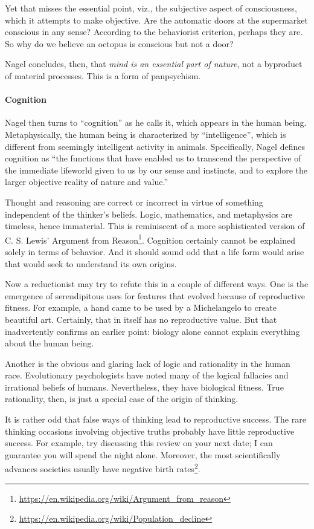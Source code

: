 Yet that misses the essential point, viz., the subjective aspect of consciousness, which it attempts to make objective.
Are the automatic doors at the supermarket conscious in any sense? According to the behaviorist criterion, perhaps they
are. So why do we believe an octopus is conscious but not a door?

Nagel concludes, then, that \emph{mind is an essential part of nature}, not a byproduct of material processes. This is a
form of panpsychism.

\paragraph{Cognition}
Nagel then turns to “cognition” as he calls it, which appears in the human being. Metaphysically, the human being is
characterized by “intelligence”, which is different from seemingly intelligent activity in animals. Specifically, Nagel
defines cognition as “the functions that have enabled us to transcend the perspective of the immediate lifeworld given
to us by our sense and instincts, and to explore the larger objective reality of nature and value.”

Thought and reasoning are correct or incorrect in virtue of something independent of the thinker's beliefs.
Logic, mathematics, and metaphysics are timeless, hence immaterial. This is reminiscent of a more sophisticated version
of C. S. Lewis' Argument from Reason\footnote{\url{https://en.wikipedia.org/wiki/Argument_from_reason}}. Cognition certainly cannot be explained solely in terms of behavior.
And it should sound odd that a life form would arise that would seek to understand its own origins.

Now a reductionist may try to refute this in a couple of different ways. One is the emergence of serendipitous uses for
features that evolved because of reproductive fitness. For example, a hand came to be used by a Michelangelo to create
beautiful art. Certainly, that in itself has no reproductive value. But that inadvertently confirms an earlier point:
biology alone cannot explain everything about the human being.

Another is the obvious and glaring lack of logic and rationality in the human race. Evolutionary psychologists have
noted many of the logical fallacies and irrational beliefs of humans. Nevertheless, they have biological fitness. True
rationality, then, is just a special case of the origin of thinking.

It is rather odd that false ways of thinking lead to reproductive success. The rare thinking occasions involving
objective truths probably have little reproductive success. For example, try discussing this review on your next date;
I can guarantee you will spend the night alone. Moreover, the most scientifically advances societies usually have
negative birth rates\footnote{\url{https://en.wikipedia.org/wiki/Population_decline}}.

